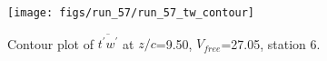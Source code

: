 \begin{figure}[H]
\centering
\texttt{[image: figs/run\_57/run\_57\_tw\_contour]}
\caption{Contour plot of $\overline{t^\prime w^\prime}$ at $z/c$=9.50, $V_{free}$=27.05, station 6.}
\end{figure}


